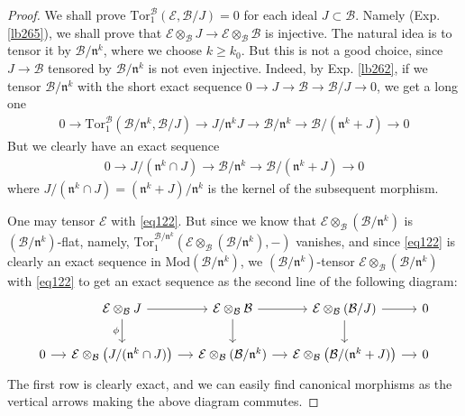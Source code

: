 \documentclass[12pt,b5paper,notitlepage]{report}
\theoremstyle{definition}
\theoremstyle{plain}
\newcommand{\fk}{\mathfrak}
\newcommand{\mc}{\mathcal}
\newcommand{\Tor}{\mathrm{Tor}}
\newcommand{\Mod}{\mathrm{Mod}}
\numberwithin{equation}{section}
\begin{document}
\begin{proof}
We shall prove $\Tor_1^{\mc B}(\mc E,\mc B/J)=0$ for each ideal $J\subset\mc B$. Namely (Exp. \ref{lb265}), we shall prove that $\mc E\otimes_{\mc B}J\rightarrow\mc E\otimes_{\mc B}\mc B$ is injective. The natural idea is to tensor it by $\mc B/\fk n^k$, where we choose $k\geq k_0$. But this is not a good choice, since $J\rightarrow\mc B$ tensored by $\mc B/\fk n^k$ is not even injective. Indeed, by Exp. \ref{lb262}, if we tensor $\mc B/\fk n^k$ with the short exact sequence $0\rightarrow J\rightarrow\mc B\rightarrow\mc B/J\rightarrow0$, we get a long one
\begin{align}
0\rightarrow\Tor_1^{\mc B}(\mc B/\fk n^k,\mc B/J)\rightarrow J/\fk n^kJ\rightarrow\mc B/\fk n^k\rightarrow\mc B/(\fk n^k+J)\rightarrow0 \label{eq124}
\end{align}
But we clearly have an exact sequence
\begin{align}
0\rightarrow J/(\fk n^k\cap J)\rightarrow\mc B/\fk n^k\rightarrow\mc B/(\fk n^k+J)\rightarrow0   \label{eq122}
\end{align}
where $J/(\fk n^k\cap J)=(\fk n^k+J)/\fk n^k$ is the kernel of the subsequent morphism.

One may tensor $\mc E$ with \eqref{eq122}. But since we know that $\mc E\otimes_{\mc B}(\mc B/\fk n^k)$ is $(\mc B/\fk n^k)$-flat, namely, $\Tor_1^{\mc B/\fk n^k}(\mc E\otimes_{\mc B}(\mc B/\fk n^k),-)$ vanishes, and since \eqref{eq122} is clearly an exact sequence in $\Mod(\mc B/\fk n^k)$, we $(\mc B/\fk n^k)$-tensor $\mc E\otimes_{\mc B}(\mc B/\fk n^k)$ with \eqref{eq122} to get an exact sequence as the second line of the following diagram:
\begin{equation}\label{eq123}
\begin{tikzcd}[column sep=small]
            & \mc E\otimes_{\mc B}J \arrow[r] \arrow[d,"\phi"'] & \mc E\otimes_{\mc B}\mc B \arrow[r] \arrow[d] & \mc E\otimes_{\mc B}(\mc B/J) \arrow[r] \arrow[d] & 0 \\
0 \arrow[r] & \mc E\otimes_{\mc B}\big(J/(\fk n^k\cap J)\big) \arrow[r]           & \mc E\otimes_{\mc B}(\mc B/\fk n^k) \arrow[r]           & \mc E\otimes_{\mc B}\big(\mc B/(\fk n^k+J)\big) \arrow[r]           & 0
\end{tikzcd}
\end{equation}
The first row is clearly exact, and we can easily find canonical morphisms as the vertical arrows making the above diagram commutes.


\end{proof}
\end{document}
